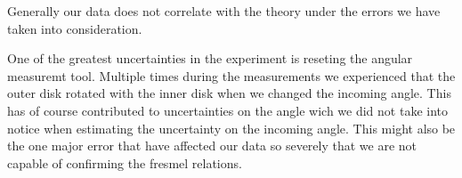 
Generally our data does not correlate with the theory under the errors we have taken into consideration. 


One of the greatest uncertainties in the experiment is reseting the angular measuremt tool. Multiple times during the measurements we experienced that the outer disk rotated with the inner disk when we changed the incoming angle. This has of course contributed to uncertainties on the angle wich we did not take into notice when estimating the uncertainty on the incoming angle. This might also be the one major error that have affected our data so severely that we are not capable of confirming the fresmel relations. 